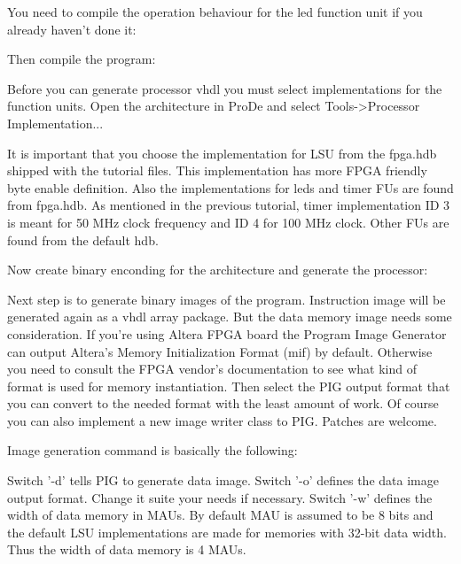 \documentclass[twoside]{tceusermanual}
\begin{document}
You need to compile the operation behaviour for the led function unit if you
already haven't done it:


Then compile the program:


Before you can generate processor vhdl you must select implementations for
the function units. Open the architecture in ProDe and select Tools->Processor
Implementation...


It is important that you choose the implementation for LSU from the fpga.hdb
shipped with the tutorial files. This implementation has more FPGA friendly
byte enable definition. Also the implementations for leds and timer FUs are
found from fpga.hdb. As mentioned in the previous tutorial, timer
implementation ID 3 is meant for 50 MHz clock frequency and ID 4 for 100 MHz
clock. Other FUs are found from the default hdb.

Now create binary enconding for the architecture and generate the processor:



Next step is to generate binary images of the program. Instruction image will
be generated again as a vhdl array package. But the data memory image needs
some consideration. If you're using Altera FPGA board the Program Image
Generator can output Altera's Memory Initialization Format (mif) by default.
Otherwise you need to consult the FPGA vendor's documentation to see what kind
of format is used for memory instantiation. Then select the PIG output format
that you can convert to the needed format with the least amount of work. Of
course you can also implement a new image writer class to PIG. Patches are
welcome.

Image generation command is basically the following:


Switch '-d' tells PIG to generate data image. Switch '-o' defines the data
image output format. Change it suite your needs if necessary. Switch '-w'
defines the width of data memory in MAUs. By default MAU is assumed to be 8
bits and the default LSU implementations are made for memories with 32-bit
data width. Thus the width of data memory is 4 MAUs.
\end{document}
